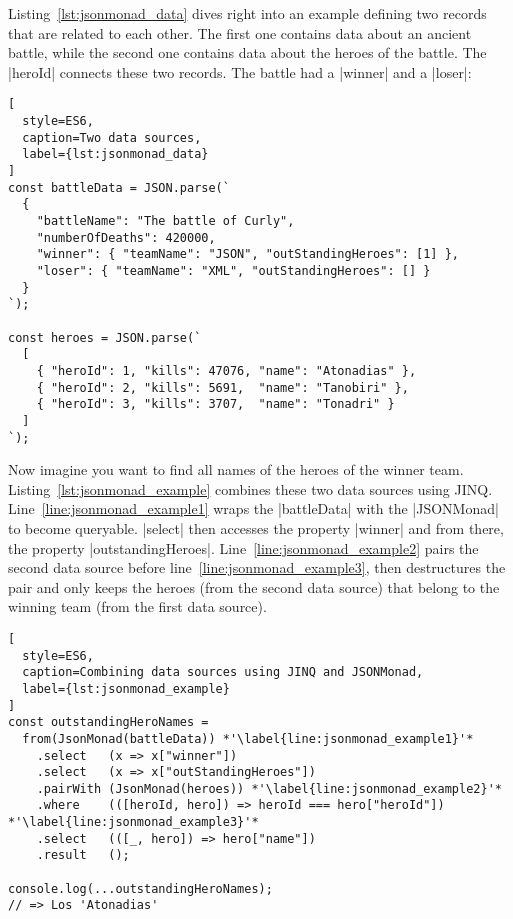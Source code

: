Listing~\ref{lst:jsonmonad_data} dives right into an example defining two
records that are related to each other. The first one contains data about an
ancient battle, while the second one contains data about the heroes of the
battle. The |heroId| connects these two records. The battle had a |winner| and
a |loser|:

\begin{lstlisting}[
  style=ES6,
  caption=Two data sources,
  label={lst:jsonmonad_data}
]
const battleData = JSON.parse(`
  {
    "battleName": "The battle of Curly",
    "numberOfDeaths": 420000,
    "winner": { "teamName": "JSON", "outStandingHeroes": [1] },
    "loser": { "teamName": "XML", "outStandingHeroes": [] }
  }
`);

const heroes = JSON.parse(`
  [
    { "heroId": 1, "kills": 47076, "name": "Atonadias" },
    { "heroId": 2, "kills": 5691,  "name": "Tanobiri" },
    { "heroId": 3, "kills": 3707,  "name": "Tonadri" }
  ]
`);
\end{lstlisting}

Now imagine you want to find all names of the heroes of the winner team. \\ 
Listing~\ref{lst:jsonmonad_example} combines these two data sources using JINQ.
Line~\ref{line:jsonmonad_example1} wraps the |battleData| with the |JSONMonad|
to become queryable. |select| then accesses the property |winner| and from
there, the property |outstandingHeroes|. Line~\ref{line:jsonmonad_example2}
pairs the second data source before line~\ref{line:jsonmonad_example3}, then
destructures the pair and only keeps the heroes (from the second data source)
that belong to the winning team (from the first data source).

\begin{lstlisting}[
  style=ES6,
  caption=Combining data sources using JINQ and JSONMonad,
  label={lst:jsonmonad_example}
]
const outstandingHeroNames =
  from(JsonMonad(battleData)) *'\label{line:jsonmonad_example1}'*
    .select   (x => x["winner"])
    .select   (x => x["outStandingHeroes"])
    .pairWith (JsonMonad(heroes)) *'\label{line:jsonmonad_example2}'*
    .where    (([heroId, hero]) => heroId === hero["heroId"]) *'\label{line:jsonmonad_example3}'*
    .select   (([_, hero]) => hero["name"])
    .result   ();

console.log(...outstandingHeroNames);
// => Los 'Atonadias'
\end{lstlisting}

